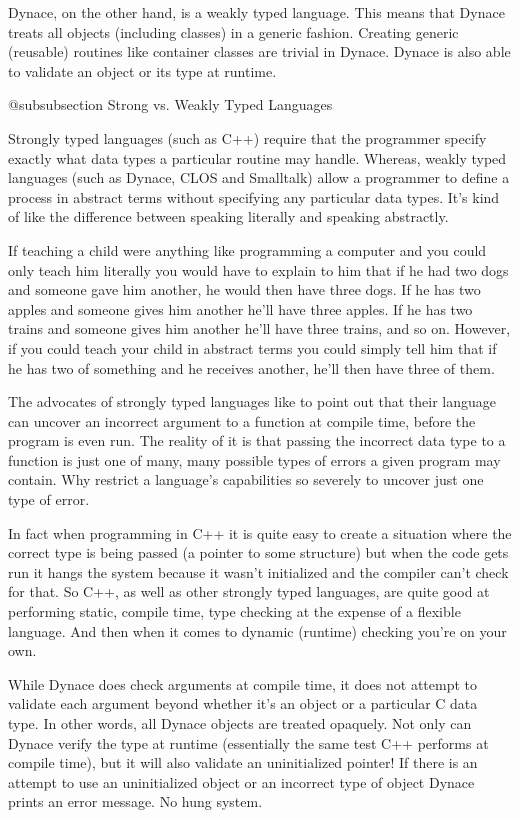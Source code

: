 Dynace, on the other hand, is a weakly typed language.  This means
that Dynace treats all objects (including classes) in a generic
fashion.  Creating generic (reusable) routines like container classes
are trivial in Dynace.  Dynace is also able to validate an object or
its type at runtime.


@subsubsection Strong vs. Weakly Typed Languages

Strongly typed languages (such as C++) require that the programmer
specify exactly what data types a particular routine may handle.
Whereas, weakly typed languages (such as Dynace, CLOS and Smalltalk)
allow a programmer to define a process in abstract terms without
specifying any particular data types.  It's kind of like the
difference between speaking literally and speaking abstractly.

If teaching a child were anything like programming a computer and you
could only teach him literally you would have to explain to him that
if he had two dogs and someone gave him another, he would then have
three dogs.  If he has two apples and someone gives him another he'll
have three apples.  If he has two trains and someone gives him another
he'll have three trains, and so on.  However, if you could teach your
child in abstract terms you could simply tell him that if he has two
of something and he receives another, he'll then have three of them.

The advocates of strongly typed languages like to point out that their
language can uncover an incorrect argument to a function at compile
time, before the program is even run.  The reality of it is that passing
the incorrect data type to a function is just one of many, many possible
types of errors a given program may contain.  Why restrict a language's
capabilities so severely to uncover just one type of error.  

In fact when programming in C++ it is quite easy to create a situation
where the correct type is being passed (a pointer to some structure)
but when the code gets run it hangs the system because it wasn't
initialized and the compiler can't check for that. So C++, as well as
other strongly typed languages, are quite good at performing static,
compile time, type checking at the expense of a flexible language.
And then when it comes to dynamic (runtime) checking you're on your
own.

While Dynace does check arguments at compile time, it does not attempt
to validate each argument beyond whether it's an object or a particular
C data type.  In other words, all Dynace objects are treated opaquely.
Not only can Dynace verify the type at runtime (essentially the same
test C++ performs at compile time), but it will also validate an
uninitialized pointer!  If there is an attempt to use an uninitialized
object or an incorrect type of object Dynace prints an error message.
No hung system.

